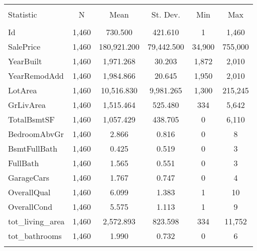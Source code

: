 \documentclass{article}
\begin{document}
\begin{table}[!htbp] \centering 
  \caption{} 
  \label{} 
\begin{tabular}{@{\extracolsep{5pt}}lccccc} 
\\[-1.8ex]\hline 
\hline \\[-1.8ex] 
Statistic & \multicolumn{1}{c}{N} & \multicolumn{1}{c}{Mean} & \multicolumn{1}{c}{St. Dev.} & \multicolumn{1}{c}{Min} & \multicolumn{1}{c}{Max} \\ 
\hline \\[-1.8ex] 
Id & 1,460 & 730.500 & 421.610 & 1 & 1,460 \\ 
SalePrice & 1,460 & 180,921.200 & 79,442.500 & 34,900 & 755,000 \\ 
YearBuilt & 1,460 & 1,971.268 & 30.203 & 1,872 & 2,010 \\ 
YearRemodAdd & 1,460 & 1,984.866 & 20.645 & 1,950 & 2,010 \\ 
LotArea & 1,460 & 10,516.830 & 9,981.265 & 1,300 & 215,245 \\ 
GrLivArea & 1,460 & 1,515.464 & 525.480 & 334 & 5,642 \\ 
TotalBsmtSF & 1,460 & 1,057.429 & 438.705 & 0 & 6,110 \\ 
BedroomAbvGr & 1,460 & 2.866 & 0.816 & 0 & 8 \\ 
BsmtFullBath & 1,460 & 0.425 & 0.519 & 0 & 3 \\ 
FullBath & 1,460 & 1.565 & 0.551 & 0 & 3 \\ 
GarageCars & 1,460 & 1.767 & 0.747 & 0 & 4 \\ 
OverallQual & 1,460 & 6.099 & 1.383 & 1 & 10 \\ 
OverallCond & 1,460 & 5.575 & 1.113 & 1 & 9 \\ 
tot\_living\_area & 1,460 & 2,572.893 & 823.598 & 334 & 11,752 \\ 
tot\_bathrooms & 1,460 & 1.990 & 0.732 & 0 & 6 \\ 
\hline \\[-1.8ex] 
\end{tabular} 
\end{table} 
\end{document}
